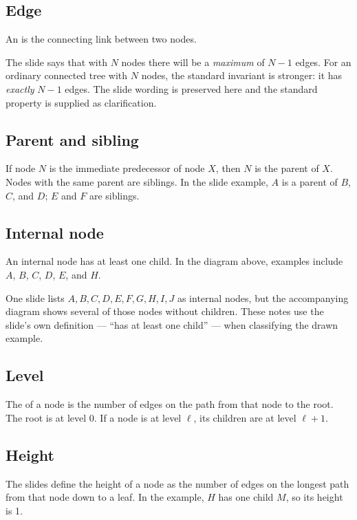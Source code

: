 \subsection{Edge}
An  is the connecting link between two nodes.

\begin{clarification}
The slide says that with $N$ nodes there will be a \emph{maximum} of $N-1$ edges. For an ordinary connected tree with $N$ nodes, the standard invariant is stronger: it has \emph{exactly} $N-1$ edges. The slide wording is preserved here and the standard property is supplied as clarification.
\end{clarification}

\subsection{Parent and sibling}
If node $N$ is the immediate predecessor of node $X$, then $N$ is the parent of $X$. Nodes with the same parent are siblings. In the slide example, $A$ is a parent of $B$, $C$, and $D$; $E$ and $F$ are siblings.

\subsection{Internal node}
An internal node has at least one child. In the diagram above, examples include $A$, $B$, $C$, $D$, $E$, and $H$.

\begin{clarification}
One slide lists $A,B,C,D,E,F,G,H,I,J$ as internal nodes, but the accompanying diagram shows several of those nodes without children. These notes use the slide's own definition --- ``has at least one child'' --- when classifying the drawn example.
\end{clarification}

\subsection{Level}
The  of a node is the number of edges on the path from that node to the root. The root is at level 0. If a node is at level $\ell$, its children are at level $\ell+1$.

\subsection{Height}
The slides define the height of a node as the number of edges on the longest path from that node down to a leaf. In the example, $H$ has one child $M$, so its height is 1.

